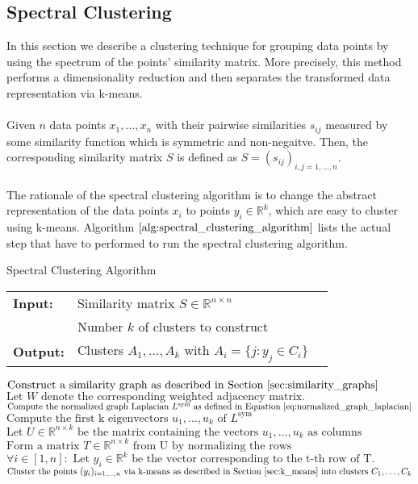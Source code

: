 \subsection{Spectral Clustering}
\label{sec:spectral_clustering_bg}
In this section we describe a clustering technique for grouping data points by using the spectrum of the points' similarity matrix. More precisely, this method performs a dimensionality reduction and then separates the transformed data representation via k-means. \\ \\
Given $n$ data points $x_1, \dots, x_n$ with their pairwise similarities $s_{ij}$ measured by some similarity function which is symmetric and non-negaitve. Then, the corresponding similarity matrix $S$ is defined as $S = (s_{ij})_{i,j=1,\dots,n}$. \\ \\
The rationale of the spectral clustering algorithm is to change the abstract representation of the data points $x_i$ to points $y_i \in \mathbb{R}^k$, which are easy to cluster using k-means. Algorithm $\ref{alg:spectral_clustering_algorithm}$ lists the actual step that have to performed to run the spectral clustering algorithm.
\begin{algorithm}[H]
\caption{Spectral Clustering Algorithm}
\begin{table}[H]
  \begin{tabular}{@{}lll@{}}
    \textbf{Input:} & Similarity matrix $S \in \mathbb{R}^{n \times n}$ \\
		& Number $k$ of clusters to construct \\
    \textbf{Output:} & Clusters $A_1, \dots, A_k$ with $A_i = \{ j : y_j \in C_i\}$ \\
  \end{tabular} 
\end{table}
\setlength{\fboxrule}{0pt} 
\begin{boxedminipage}{1.0\textwidth}
  \begin{algorithmic}[1]
  	  \State $\text{Construct a similarity graph as described in Section }\ref{sec:similarity_graphs}$
  	  \State $\text{Let } W \text{ denote the corresponding weighted adjacency matrix}.$
  	  \State $\text{Compute the normalized graph Laplacian } L^{\text{sym}} \text{ as defined in Equation } \ref{eq:normalized_graph_laplacian}$
  	  \State $\text{Compute the first k eigenvectors } u_1,\dots,u_k \text{ of } L^{\text{sym}}$
  	  \State $\text{Let } U \in \mathbb{R}^{n \times k} \text{ be the matrix containing the vectors } u_1,\dots,u_k \text{ as columns}$
  	  \State $\text{Form a matrix } T \in \mathbb{R}^{n \times k} \text{ from U by normalizing the rows}$
  	  \State $\forall i \in \left[ 1, n \right]: \text{ Let } y_i \in \mathbb{R}^k \text{ be the vector corresponding to the t-th row of T.}$
  	  \State $\text{Cluster the points } (y_i)_{i=1,\dots,n} \text{ via k-means as described in Section } \ref{sec:k_means} \text{ into clusters } C_1, \dots, C_k$
  \end{algorithmic}
  \end{boxedminipage}
  \vskip1.5pt
\label{alg:spectral_clustering_algorithm}
\end{algorithm}
